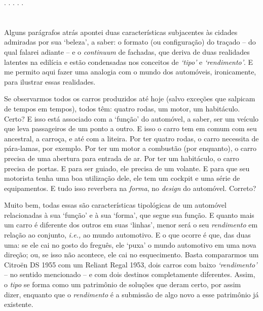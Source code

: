 \documentclass[12pt, a4paper]{book} %
\begin{document}
        \begin{center}
            . . . . .
        \end{center} 

            \section{}%
            Alguns parágrafos atrás apontei duas características subjacentes às cidades admiradas por sua `beleza', a saber: o formato (ou configuração) do traçado – do qual falarei adiante – e o \textit{continuum} de fachadas, que deriva de duas realidades latentes na edilícia e estão condensadas nos conceitos de \emph{`tipo'} e \emph{`rendimento'}. E me permito aqui fazer uma analogia com o mundo dos automóveis, ironicamente, para ilustrar essas realidades.

            Se observarmos todos os carros produzidos até hoje (salvo exceções que salpicam de tempos em tempos), todos têm: quatro rodas, um motor, um habitáculo. Certo? E isso está associado com a `função' do automóvel, a saber, ser um veículo que leva passageiros de um ponto a outro. E isso o carro tem em comum com seu ancestral, a carroça, e até com a liteira. Por ter quatro rodas, o carro necessita de pára-lamas, por exemplo. Por ter um motor a combustão (por enquanto), o carro precisa de uma abertura para entrada de ar. Por ter um habitáculo, o carro precisa de portas. E para ser guiado, ele precisa de um volante. E para que seu motorista tenha uma boa utilização dele, ele tem um cockpit e uma série de equipamentos. E tudo isso reverbera na \textit{forma}, no \textit{design} do automóvel. Correto? 

            Muito bem, todas essas são características tipológicas de um automóvel relacionadas à sua `função' e à sua `forma', que segue sua função. E quanto mais um carro é diferente dos outros em suas `linhas', menor será o seu \textit{rendimento} em relação ao conjunto, \textit{i.e.,} ao mundo automotivo. E o que ocorre é que, das duas uma: se ele cai no gosto do freguês, ele `puxa' o mundo automotivo em uma nova direção; ou, se isso não acontece, ele cai no esquecimento. Basta compararmos um Citroën DS 1955 com um Reliant Regal 1953, dois carros com baixo \textit{`rendimento'} – no sentido mencionado – e com dois destinos completamente diferentes. Assim, o \textit{tipo} se forma como um patrimônio de soluções que deram certo, por assim dizer, enquanto que o \textit{rendimento} é a submissão de algo novo a esse patrimônio já existente.
	
\end{document}
